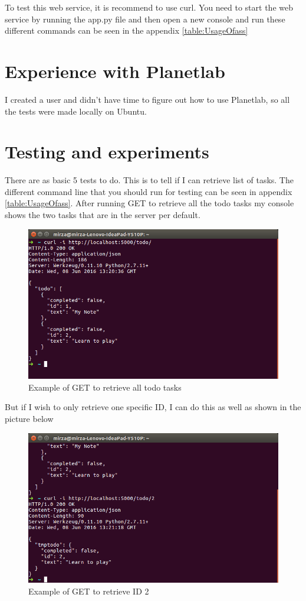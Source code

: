 \documentclass{sig-alternate-05-2015}
\begin{document}
To test this web service, it is recommend to use curl. You need to start the web service by running the app.py file and then open a new console and run these different commands can be seen in the appendix \ref{table:UsageOfass}

\section{Experience with Planetlab}
I created a user and didn't have time to figure out how to use Planetlab, so all the tests were made locally on Ubuntu.

\section{Testing and experiments}
There are as basic 5 tests to do. This is to tell if I can retrieve list of tasks. The different command line that you should run for testing can be seen in appendix \ref{table:UsageOfass}.
After running GET to retrieve all the todo tasks my console shows the two tasks that are in the server per default.
\begin{figure}[H]
  \centering
  \includegraphics[scale=0.35]{GETAll.png}
  \caption{Example of GET to retrieve all todo tasks}\label{GETALL}
\end{figure}
But if I wish to only retrieve one specific ID, I can do this as well as shown in the picture below
\begin{figure}[H]
  \centering
  \includegraphics[scale=0.35]{GETID.png}
  \caption{Example of GET to retrieve ID 2}\label{GETID}
\end{figure}
\end{document}
